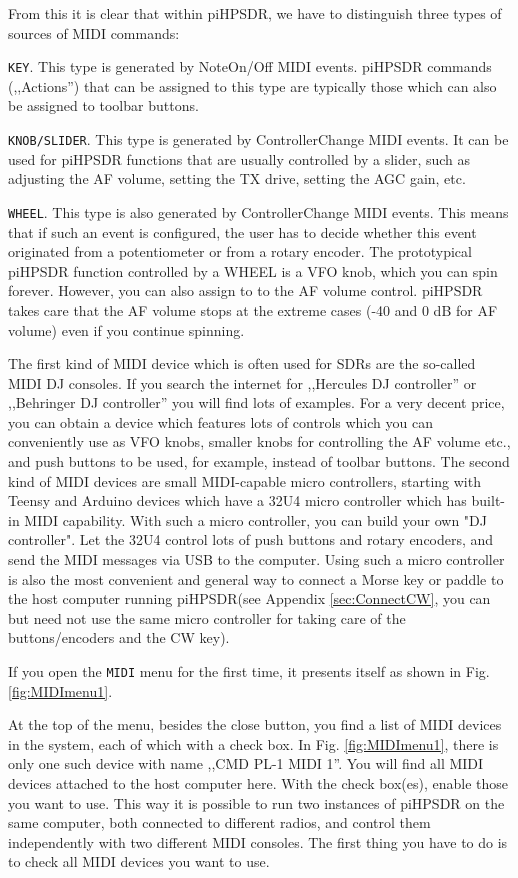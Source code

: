 \documentclass[12pt]{book}
\def\rett#1{\texttt{\color{red}#1}}
\def\bltt#1{\texttt{\color{blue}#1}}
\def\pH{pi\-HPSDR\xspace}
\begin{document}
From this it is clear that within \pH, we have to distinguish three types of sources
of MIDI commands:

\rett{KEY}. This type is generated by NoteOn/Off MIDI events. \pH commands (,,Actions'') that
can be assigned to this type are typically those which can also be assigned to toolbar
buttons.

\rett{KNOB/SLIDER}. This type is generated by ControllerChange MIDI events. It can be used
for \pH functions that are usually controlled by a slider, such as adjusting the AF
volume, setting the TX drive, setting the AGC gain, etc.

\rett{WHEEL}. This type is also generated by ControllerChange MIDI events. This means
that if such an event is configured, the user has to decide whether this event
originated from a potentiometer or from a rotary encoder. The prototypical \pH
function controlled by a WHEEL is a VFO knob, which you can spin forever. However,
you can also assign to to the AF volume control. \pH takes care that the
AF volume stops at the extreme cases (-40 and 0 dB for AF volume) even if you continue
spinning.

The first kind of MIDI device which is often used for SDRs are the so-called MIDI DJ
consoles. If you search the internet for ,,Hercules DJ controller'' or ,,Behringer
DJ controller'' you will find lots of examples. For a very decent price, you
can obtain a device which features lots of controls which you can conveniently use
as VFO knobs, smaller knobs for controlling the AF volume etc., and push buttons
to be used, for example, instead of toolbar buttons. The second kind of MIDI devices
are small MIDI-capable micro controllers, starting with Teensy and Arduino devices
which have a 32U4 micro controller which has built-in MIDI capability. With such a
micro controller, you can build your own "DJ controller". Let the 32U4 control
lots of push buttons and rotary encoders, and send the MIDI messages via USB to the
computer. Using such a micro controller is also the most convenient and general way
to connect a Morse key or paddle to the host computer running \pH (see
Appendix \ref{sec:ConnectCW}, you can but need not use the same micro controller
for taking care of the buttons/encoders and the CW key).

If you open the \bltt{MIDI} menu for the first time, it presents itself as shown
in Fig. \ref{fig:MIDImenu1}.



At the top of the menu, besides the close button, you find a list of MIDI devices
in the system, each of which with a check box. In Fig. \ref{fig:MIDImenu1}, there is only
one such device with name ,,CMD PL-1 MIDI 1''. You will find all MIDI devices attached
to the host computer here. With the check box(es), enable those you want to use.
This way it is possible to run two instances of \pH on the same computer, both
connected to different radios, and control them independently with two different MIDI
consoles. The first thing you have to do is to check all MIDI devices you want to use.
\end{document}

